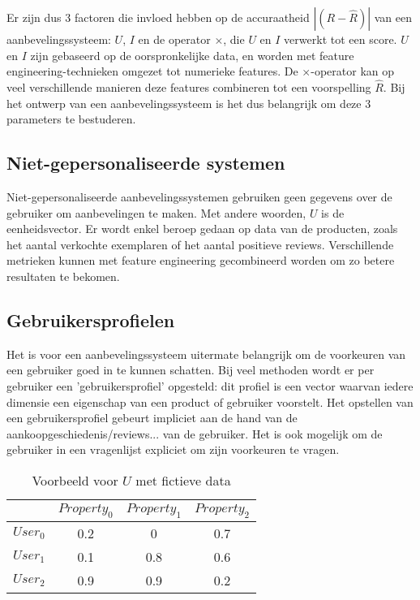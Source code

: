 Er zijn dus 3 factoren die invloed hebben op de accuraatheid $|(R - \hat{R})|$ van een aanbevelingssysteem: $U$, $I$ en de operator $\times$, die $U$ en $I$ verwerkt tot een score. $U$ en $I$ zijn gebaseerd op de oorspronkelijke data, en worden met feature engineering-technieken omgezet tot numerieke features. De $\times$-operator kan op veel verschillende manieren deze features combineren tot een voorspelling $\hat{R}$. Bij het ontwerp van een aanbevelingssysteem is het dus belangrijk om deze 3 parameters te bestuderen.

\subsection{Niet-gepersonaliseerde systemen}
\label{sec:chapt2_non_persionalised}
Niet-gepersonaliseerde aanbevelingssystemen gebruiken geen gegevens over de gebruiker om aanbevelingen te maken. Met andere woorden, $U$ is de eenheidsvector. Er wordt enkel beroep gedaan op data van de producten, zoals het aantal verkochte exemplaren of het aantal positieve reviews. Verschillende metrieken kunnen met feature engineering gecombineerd worden om zo betere resultaten te bekomen.

\subsection{Gebruikersprofielen}
Het is voor een aanbevelingssysteem uitermate belangrijk om de voorkeuren van een gebruiker goed in te kunnen schatten. Bij veel methoden wordt er per gebruiker een 'gebruikersprofiel' opgesteld: dit profiel is een vector waarvan iedere dimensie een eigenschap van een product of gebruiker voorstelt. Het opstellen van een gebruikersprofiel gebeurt impliciet aan de hand van de aankoopgeschiedenis/reviews... van de gebruiker. Het is ook mogelijk om de gebruiker in een vragenlijst expliciet om zijn voorkeuren te vragen.

\begin{table}[H]
\centering
\begin{tabular}{c|ccc}
         & $Property_0$ & $Property_1$ & $Property_2$ \\ \hline
$User_0$ & 0.2          & 0            & 0.7          \\
$User_1$ & 0.1          & 0.8          & 0.6          \\
$User_2$ & 0.9          & 0.9          & 0.2         
\end{tabular}
\caption{Voorbeeld voor $U$ met fictieve data}
\label{tab:chap2_user_profiles}
\end{table}

